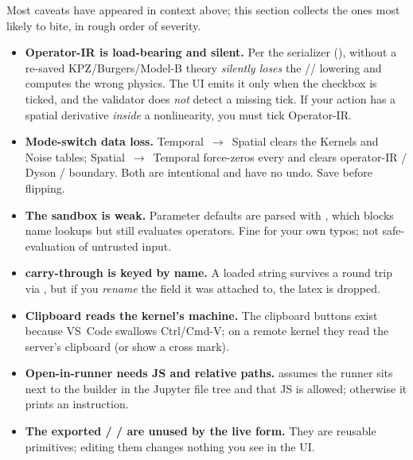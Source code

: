 Most caveats have appeared in context above; this section collects the ones most
likely to bite, in rough order of severity.

\begin{itemize}
  \item \textbf{Operator-IR is load-bearing and silent.} Per the serializer
        (), without 
        a re-saved KPZ/Burgers/Model-B theory \emph{silently loses} the
        // lowering and computes the wrong
        physics. The UI emits it only when the checkbox is ticked, and the
        validator does \emph{not} detect a missing tick. If your action has a
        spatial derivative \emph{inside} a nonlinearity, you must tick Operator-IR.
  \item \textbf{Mode-switch data loss.} Temporal~$\to$~Spatial clears the Kernels
        and Noise tables; Spatial~$\to$~Temporal force-zeros every
         and clears operator-IR / Dyson / boundary. Both are
        intentional and have no undo. Save before flipping.
  \item \textbf{The  sandbox is weak.} Parameter defaults are parsed
        with , which blocks
        name lookups but still evaluates operators. Fine for your own typos; not
        safe-evaluation of untrusted input.
  \item \textbf{ carry-through is keyed by name.} A loaded 
        string survives a round trip via , but if you
        \emph{rename} the field it was attached to, the latex is dropped.
  \item \textbf{Clipboard reads the kernel's machine.} The clipboard buttons exist
        because VS~Code swallows Ctrl/Cmd-V; on a remote kernel they read the
        server's clipboard (or show a cross mark).
  \item \textbf{Open-in-runner needs JS and relative paths.}
         assumes the runner sits next
        to the builder in the Jupyter file tree and that JS is allowed; otherwise it
        prints an instruction.
  \item \textbf{The exported  /  /
         are unused by the live form.} They are reusable
        primitives; editing them changes nothing you see in the UI.
\end{itemize}

